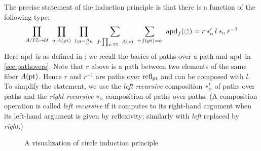 \documentclass[a4paper,12pt]{amsart}
\begin{document}
The precise statement of the induction principle is that there is a
function of the following type:
\begin{equation}
  \label{eq:circle-induction}
  \thinmuskip=10mu              %
  \prod_{A: \TorZ\to\UU}
  \prod_{a: A(\pt)}
  \prod_{l: a=^A_{\Zloop} a}
  \sum_{f: \prod_{z:\TorZ} A(z)}
  \sum_{r: f(\pt)= a}
  {\apd{f}(\Zloop) = r\cto' l \cto r^{-1}}
\end{equation}
Here $\mathop{{\mathrm{apd}}_{}}$ is as defined in \cite[2.3]{hottbook};
we recall the basics of paths over a path and $\mathop{{\mathrm{apd}}_{}}$ in \cref{sec:pathovers}.
Note that $r$ above is a path between two elements of the same fiber $A({\mathord{\mathrm{pt}}})$.
Hence $r$ and $r^{-1}$ are paths over $\mathop{{\mathrm{refl}}_{{\mathord{\mathrm{pt}}}}}$ and can be composed with $l$.
To simplify the statement, we use the \emph{left recursive}
composition $*_{\mathrm{o}}'$ of paths over paths and the \emph{right recursive} $*_{\mathrm{o}}$ composition of paths over paths.
(A composition operation is called \emph{left recursive} if it computes to its right-hand argument when its
 left-hand argument is given by reflexivity; similarly with \emph{left} replaced by \emph{right}.)

\begin{figure}
  \centering
  \caption{A visualization of circle induction principle}
  \label{fig:circle-induction}
\end{figure}
\end{document}
